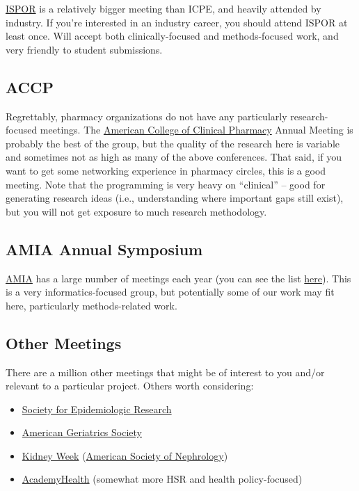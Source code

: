 \documentclass[
  letterpaper,
  DIV=11,
  numbers=noendperiod]{scrreprt}
\begin{document}
\href{https://www.ispor.org/}{ISPOR} is a relatively bigger meeting than
ICPE, and heavily attended by industry. If you're interested in an
industry career, you should attend ISPOR at least once. Will accept both
clinically-focused and methods-focused work, and very friendly to
student submissions.

\hypertarget{accp}{%
\subsection{ACCP}\label{accp}}

Regrettably, pharmacy organizations do not have any particularly
research-focused meetings. The \href{https://www.accp.com/}{American
College of Clinical Pharmacy} Annual Meeting is probably the best of the
group, but the quality of the research here is variable and sometimes
not as high as many of the above conferences. That said, if you want to
get some networking experience in pharmacy circles, this is a good
meeting. Note that the programming is very heavy on ``clinical'' -- good
for generating research ideas (i.e., understanding where important gaps
still exist), but you will not get exposure to much research
methodology.

\hypertarget{amia-annual-symposium}{%
\subsection{AMIA Annual Symposium}\label{amia-annual-symposium}}

\href{https://amia.org/}{AMIA} has a large number of meetings each year
(you can see the list \href{https://amia.org/education-events}{here}).
This is a very informatics-focused group, but potentially some of our
work may fit here, particularly methods-related work.

\hypertarget{other-meetings}{%
\subsection{Other Meetings}\label{other-meetings}}

There are a million other meetings that might be of interest to you
and/or relevant to a particular project. Others worth considering:

\begin{itemize}
\item
  \href{https://epiresearch.org/annual-meeting/}{Society for
  Epidemiologic Research}
\item
  \href{https://meeting.americangeriatrics.org/}{American Geriatrics
  Society}
\item
  \href{https://www.asn-online.org/education/kidneyweek/}{Kidney Week}
  (\href{https://www.asn-online.org/}{American Society of Nephrology})
\item
  \href{https://academyhealth.org/ARM}{AcademyHealth} (somewhat more HSR
  and health policy-focused)
\end{itemize}
\end{document}
